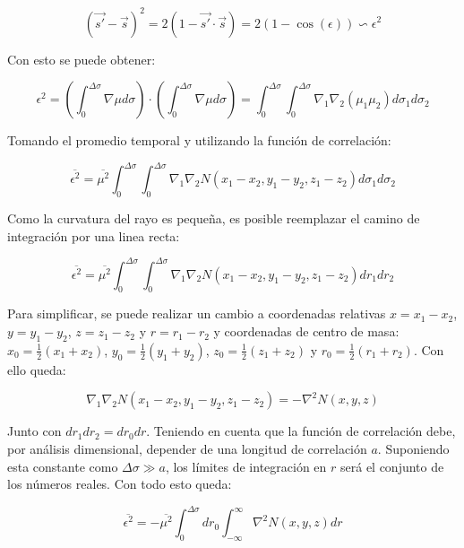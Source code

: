 \begin{equation}
    (\vec{s'} - \vec{s})^2 = 2(1 - \vec{s'}\cdot \vec{s}) = 2(1-\cos(\epsilon)) \backsim\epsilon^2
\end{equation}

Con esto se puede obtener: 

\begin{equation}
    \epsilon^2 = \left(\int_0^{\Delta \sigma}\nabla \mu d\sigma\right)\cdot\left(\int_0^{\Delta \sigma}\nabla \mu d\sigma\right) = \int_0^{\Delta \sigma} \int_0^{\Delta \sigma}\nabla_1  \nabla_2(\mu_1 \mu_2) d\sigma_1 d\sigma_2
\end{equation}

Tomando el promedio temporal y utilizando la función de correlación: 

\begin{equation}
    \overline{\epsilon^2} = \overline{\mu^2}\int_0^{\Delta \sigma} \int_0^{\Delta \sigma} \nabla_1  \nabla_2 N(x_1-x_2, y_1-y_2, z_1-z_2)d\sigma_1 d\sigma_2
\end{equation}

Como la curvatura del rayo es pequeña, es posible reemplazar el camino de integración por una linea recta:

\begin{equation}
    \overline{\epsilon^2} = \overline{\mu^2}\int_0^{\Delta \sigma} \int_0^{\Delta \sigma} \nabla_1  \nabla_2 N(x_1-x_2, y_1-y_2, z_1-z_2)dr_1 dr_2
\end{equation}

Para simplificar, se puede realizar un cambio a coordenadas relativas $x = x_1 - x_2$, $y = y_1 - y_2$, $z = z_1 - z_2$ y $r = r_1 - r_2$ y coordenadas de centro de masa: $x_0 = \frac{1}{2}(x_1+x_2)$, $y_0 = \frac{1}{2}(y_1+y_2)$, $z_0 = \frac{1}{2}(z_1+z_2)$ y $r_0 = \frac{1}{2}(r_1+r_2)$. Con ello queda:

\begin{equation}
    \nabla_1  \nabla_2 N(x_1-x_2, y_1-y_2, z_1-z_2) = - \nabla^2N(x, y, z)
\end{equation}

Junto con $dr_1dr_2 = dr_0dr$. Teniendo en cuenta que la función de correlación debe, por análisis dimensional, depender de una longitud de correlación $a$. Suponiendo esta constante como $\Delta \sigma \gg a$, los límites de integración en $r$ será el conjunto de los números reales. Con todo esto queda: 

\begin{equation}
    \overline{\epsilon^2} = -\overline{\mu^2}\int_0^{\Delta \sigma} dr_0\int_{-\infty}^{\infty}\nabla^2N(x, y, z)dr
\end{equation}

